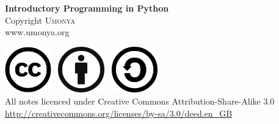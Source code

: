 \begin{titlepage}
\begin{center}
{ \huge \bfseries Introductory Programming in Python } \\[5cm]
{\LARGE Copyright \textsc{Umonya}\\
www.umonya.org }\\[1cm]

\vfill

\includegraphics[width=0.15\textwidth]{./cc-logo.jpg}~
\includegraphics[width=0.15\textwidth]{./attribution-by.png}~
\includegraphics[width=0.15\textwidth]{./share-alike-sa.png}~ \\[0.5cm]
{\large All notes licenced under Creative Commons Attribution-Share-Alike 3.0 } \\
{\large \url{http://creativecommons.org/licenses/by-sa/3.0/deed.en_GB} }\\
\end{center}
\end{titlepage}
